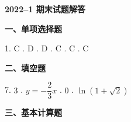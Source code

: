 \documentclass[a4paper,11pt]{ctexart}
\begin{document}
\begin{center}
  {\Large\bfseries 2022--1 期末试题解答}
\end{center}

\vspace{0.6em}

\textbf{一、单项选择题}

1. C . D . D . C . C . C

\vspace{0.8em}

\textbf{二、填空题}

7. $3$ . $y=-\dfrac{2}{3}x$ . $0$ . $\ln(1+\sqrt{2})$

\vspace{0.8em}

\textbf{三、基本计算题}
\end{document}
